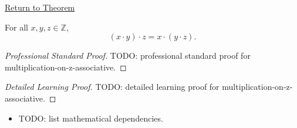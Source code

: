 \newpage
{}
\label{prf:multiplication-on-z-associative}

\begin{remark*}[Return]
\hyperref[thm:multiplication-on-z-associative]{Return to Theorem}
\end{remark*}

\begin{theorem*}
For all $x,y,z\in\mathbb{Z}$,
\[
(x\cdot y)\cdot z=x\cdot(y\cdot z).
\]
\end{theorem*}

\begin{proof}[Professional Standard Proof]
\LRAProofBodyStart
TODO: professional standard proof for multiplication-on-z-associative.
\end{proof}

\begin{proof}[Detailed Learning Proof]
\LRAProofBodyStart
TODO: detailed learning proof for multiplication-on-z-associative.
\end{proof}

\begin{remark*}
\end{remark*}

\begin{dependencies}
\begin{itemize}
  \item TODO: list mathematical dependencies.
\end{itemize}
\end{dependencies}

\clearpage
